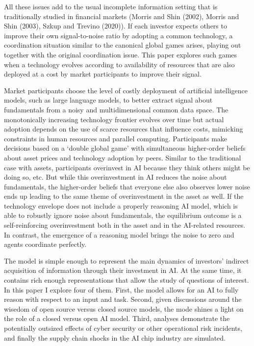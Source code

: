 \documentclass[
]{article}
\theoremstyle{plain}
\theoremstyle{remark}
\begin{document}
All these issues add to the usual incomplete information setting that is
traditionally studied in financial markets (Morris and Shin (2002),
Morris and Shin (2003), Szkup and Trevino (2020)). If each investor
expects others to improve their own signal-to-noise ratio by adopting a
common technology, a coordination situation similar to the canonical
global games arises, playing out together with the original coordination
issue. This paper explores such games when a technology evolves
according to availability of resources that are also deployed at a cost
by market participants to improve their signal.

Market participants choose the level of costly deployment of artificial
intelligence models, such as large language models, to better extract
signal about fundamentals from a noisy and multidimensional common data
space. The monotonically increasing technology frontier evolves over
time but actual adoption depends on the use of scarce resources that
influence costs, mimicking constraints in human resources and parallel
computing. Participants make decisions based on a `double global game'
with simultaneous higher-order beliefs about asset prices and technology
adoption by peers. Similar to the traditional case with assets,
participants overinvest in AI because they think others might be doing
so, etc. But while this overinvestment in AI reduces the noise about
fundamentals, the higher-order beliefs that everyone else also observes
lower noise ends up leading to the same theme of overinvestment in the
asset as well. If the technology envelope does not include a properly
reasoning AI model, which is able to robustly ignore noise about
fundamentals, the equilibrium outcome is a self-reinforcing
overinvestment both in the asset and in the AI-related resources. In
contrast, the emergence of a reasoning model brings the noise to zero
and agents coordinate perfectly.

The model is simple enough to represent the main dynamics of investors'
indirect acquisition of information through their investment in AI. At
the same time, it contains rich enough representations that allow the
study of questions of interest. In this paper I explore four of them.
First, the model allows for an AI to fully reason with respect to an
input and task. Second, given discussions around the wisedom of open
source versus closed source models, the mode shines a light on the role
of a closed versus open AI model. Third, analyses demonstrate the
potentially outsized effects of cyber security or other operational risk
incidents, and finally the supply chain shocks in the AI chip industry
are simulated.
\end{document}
